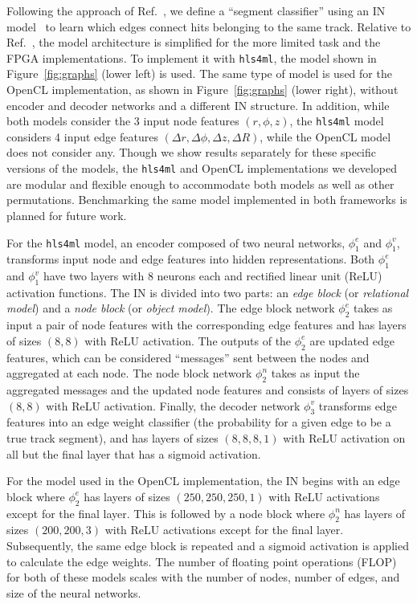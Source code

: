 \documentclass{article}
\newcommand{\hlsfml}{\texttt{hls4ml}\xspace}
\begin{document}
Following the approach of Ref.~\cite{Farrell:2018cjr,Ju:2020xty}, we define a ``segment classifier'' using an IN model~\cite{Battaglia:2016jem,battaglia2018relational} to learn which edges connect hits belonging to the same track.
Relative to Ref.~\cite{Ju:2020xty}, the model architecture is simplified for the more limited task and the FPGA implementations. 
To implement it with \hlsfml, the model shown in Figure~\ref{fig:graphs} (lower left) is used.
The same type of model is used for the OpenCL implementation, as shown in Figure~\ref{fig:graphs} (lower right), without encoder and decoder networks and a different IN structure.
In addition, while both models consider the 3 input node features $(r, \phi, z)$, the \hlsfml model considers 4 input edge features $(\Delta r, \Delta\phi, \Delta z, \Delta R)$, while the OpenCL model does not consider any.
Though we show results separately for these specific versions of the models, the \hlsfml and OpenCL implementations we developed are modular and flexible enough to accommodate both models as well as other permutations.
Benchmarking the same model implemented in both frameworks is planned for future work.


For the \hlsfml model, an encoder composed of two neural networks, $\phi_1^e$ and $\phi_1^v$, transforms input node and edge features into hidden representations.
Both $\phi_1^e$ and $\phi_1^v$ have two layers with 8 neurons each and rectified linear unit (ReLU)~\cite{relu} activation functions.
The IN is divided into two parts: an \emph{edge block} (or \emph{relational model}) and a \emph{node block} (or \emph{object model}).
The edge block network $\phi_2^e$ takes as input a pair of node features with the corresponding edge features and has layers of sizes $(8, 8)$ with ReLU activation.
The outputs of the $\phi_2^e$ are updated edge features, which can be considered ``messages'' sent between the nodes and aggregated at each node.
The node block network $\phi_2^n$ takes as input the aggregated messages and the updated node features and consists of layers of sizes $(8, 8)$ with ReLU activation.
Finally, the decoder network $\phi_3^v$ transforms edge features into an edge weight classifier (the probability for a given edge to be a true track segment), and has layers of sizes $(8, 8, 8, 1)$ with ReLU activation on all but the final layer that has a sigmoid activation.

For the model used in the OpenCL implementation, the IN begins with an edge block where $\phi_2^e$ has layers of sizes $(250, 250, 250, 1)$ with ReLU activations except for the final layer.
This is followed by a node block where $\phi_2^n$ has layers of sizes $(200, 200, 3)$ with ReLU activations except for the final layer.
Subsequently, the same edge block is repeated and a sigmoid activation is applied to calculate the edge weights.
The number of floating point operations (FLOP) for both of these models scales with the number of nodes, number of edges, and size of the neural networks. 
\end{document}
